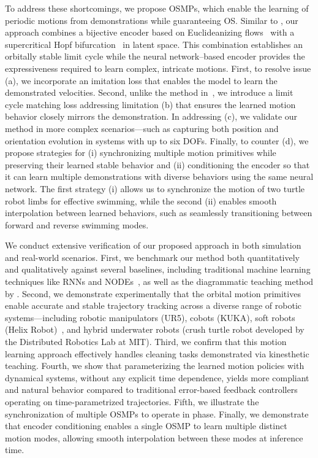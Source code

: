 To address these shortcomings, we propose \glspl{OSMP}, which enable the learning of periodic motions from demonstrations while guaranteeing \gls{OS}. Similar to \citet{zhi2024teaching}, our approach combines a bijective encoder based on Euclideanizing flows~\citep{dinh2017density, rana2020euclideanizing} with a supercritical Hopf bifurcation~\citep{strogatz2018nonlinear} in latent space. This combination establishes an orbitally stable limit cycle while the neural network–based encoder provides the expressiveness required to learn complex, intricate motions.
First, to resolve issue (a), we incorporate an imitation loss that enables the model to learn the demonstrated velocities.
Second, unlike the method in~\citep{zhi2024teaching}, we introduce a limit cycle matching loss addressing limitation (b) that ensures the learned motion behavior closely mirrors the demonstration. 
In addressing (c), we validate our method in more complex scenarios—such as capturing both position and orientation evolution in systems with up to six DOFs. Finally, to counter (d), we propose strategies for (i) synchronizing multiple motion primitives while preserving their learned stable behavior and (ii) conditioning the encoder so that it can learn multiple demonstrations with diverse behaviors using the same neural network. The first strategy (i) allows us to synchronize the motion of two turtle robot limbs for effective swimming, while the second (ii) enables smooth interpolation between learned behaviors, such as seamlessly transitioning between forward and reverse swimming modes.

We conduct extensive verification of our proposed approach in both simulation and real-world scenarios. First, we benchmark our method both quantitatively and qualitatively against several baselines, including traditional machine learning techniques like \glspl{RNN} and \glspl{NODE}~\citep{zhi2024teaching}, as well as the diagrammatic teaching method by \citet{zhi2024teaching}. Second, we demonstrate experimentally that the orbital motion primitives enable accurate and stable trajectory tracking across a diverse range of robotic systems—including robotic manipulators (UR5), cobots (KUKA), soft robots (Helix Robot)~\citep{guan2023trimmed}, and hybrid underwater robots (crush turtle robot developed by the Distributed Robotics Lab at MIT). Third, we confirm that this motion learning approach effectively handles cleaning tasks demonstrated via kinesthetic teaching. Fourth, we show that parameterizing the learned motion policies with dynamical systems, without any explicit time dependence, yields more compliant and natural behavior compared to traditional error-based feedback controllers operating on time-parametrized trajectories. Fifth, we illustrate the synchronization of multiple \glspl{OSMP} to operate in phase. Finally, we demonstrate that encoder conditioning enables a single \gls{OSMP} to learn multiple distinct motion modes, allowing smooth interpolation between these modes at inference time.

